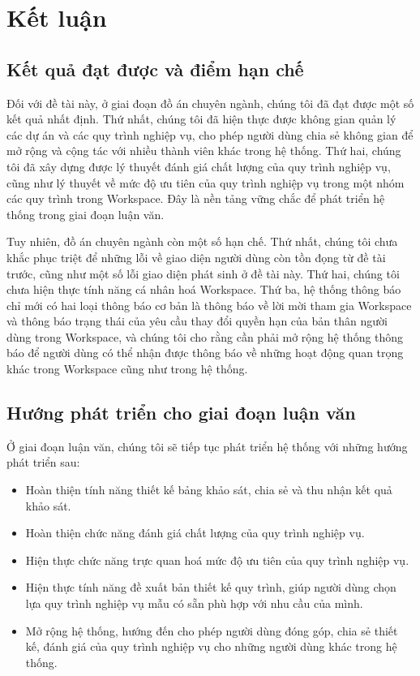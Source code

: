 \section{Kết luận}
\subsection{Kết quả đạt được và điểm hạn chế}
Đối với đề tài này, ở giai đoạn đồ án chuyên ngành, chúng tôi đã đạt được một số kết quả nhất định.
Thứ nhất, chúng tôi đã hiện thực được không gian quản lý các dự án và các quy trình nghiệp vụ, cho phép người dùng chia sẻ không gian 
để mở rộng và cộng tác với nhiều thành viên khác trong hệ thống. Thứ hai, chúng tôi đã xây dựng được lý thuyết đánh giá chất lượng của quy
trình nghiệp vụ, cũng như lý thuyết về mức độ ưu tiên của quy trình nghiệp vụ trong một nhóm các quy trình trong Workspace. Đây là nền tảng
vững chắc để phát triển hệ thống trong giai đoạn luận văn.
\par
Tuy nhiên, đồ án chuyên ngành còn một số hạn chế. Thứ nhất, chúng tôi chưa khắc phục triệt để những lỗi về giao diện người dùng còn tồn
đọng từ đề tài trước, cũng như một số lỗi giao diện phát sinh ở đề tài này. Thứ hai, chúng tôi chưa hiện thực tính năng cá nhân hoá
Workspace. Thứ ba, hệ thống thông báo chỉ mới có hai loại thông báo cơ bản là thông báo về lời mời tham gia Workspace và thông báo trạng thái
của yêu cầu thay đổi quyền hạn của bản thân người dùng trong Workspace, và chúng tôi cho rằng cần phải mở rộng hệ thống thông báo để
người dùng có thể nhận được thông báo về những hoạt động quan trọng khác trong Workspace cũng như trong hệ thống.

\subsection{Hướng phát triển cho giai đoạn luận văn}
Ở giai đoạn luận văn, chúng tôi sẽ tiếp tục phát triển hệ thống với những hướng phát triển sau:
\begin{itemize}
    \item Hoàn thiện tính năng thiết kế bảng khảo sát, chia sẻ và thu nhận kết quả khảo sát.
    \item Hoàn thiện chức năng đánh giá chất lượng của quy trình nghiệp vụ.
    \item Hiện thực chức năng trực quan hoá mức độ ưu tiên của quy trình nghiệp vụ.
    \item Hiện thực tính năng đề xuất bản thiết kế quy trình, giúp người dùng chọn lựa quy trình nghiệp vụ mẫu có sẵn phù hợp với nhu cầu của mình.
    \item Mở rộng hệ thống, hướng đến cho phép người dùng đóng góp, chia sẻ thiết kế, đánh giá của quy trình nghiệp vụ cho những người dùng khác trong hệ thống.
\end{itemize}


